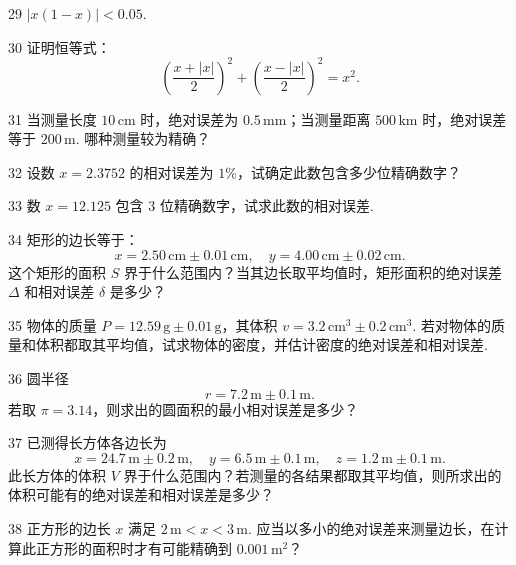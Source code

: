 \begin{prob}[S]{29}
$|x(1 - x)| < 0.05$.
\end{prob}

\begin{prob}[M]{30}
证明恒等式：
\[
\left(\frac{x + |x|}{2}\right)^2 + \left(\frac{x - |x|}{2}\right)^2 = x^2.
\]
\end{prob}

\begin{prob}[S]{31}
当测量长度 $10\,\mathrm{cm}$ 时，绝对误差为 $0.5\,\mathrm{mm}$；当测量距离 $500\,\mathrm{km}$ 时，绝对误差等于 $200\,\mathrm{m}$. 哪种测量较为精确？
\end{prob}

\begin{prob}[S]{32}
设数 $x = 2.3752$ 的相对误差为 $1\%$，试确定此数包含多少位精确数字？
\end{prob}

\begin{prob}[S]{33}
数 $x = 12.125$ 包含 $3$ 位精确数字，试求此数的相对误差.
\end{prob}

\begin{prob}[M]{34}
矩形的边长等于：
\[
x = 2.50\,\mathrm{cm} \pm 0.01\,\mathrm{cm}, \quad y = 4.00\,\mathrm{cm} \pm 0.02\,\mathrm{cm}.
\]
这个矩形的面积 $S$ 界于什么范围内？当其边长取平均值时，矩形面积的绝对误差 $\Delta$ 和相对误差 $\delta$ 是多少？
\end{prob}

\begin{prob}[M]{35}
物体的质量 $P = 12.59\,\mathrm{g} \pm 0.01\,\mathrm{g}$，其体积 $v = 3.2\,\mathrm{cm}^3 \pm 0.2\,\mathrm{cm}^3$. 若对物体的质量和体积都取其平均值，试求物体的密度，并估计密度的绝对误差和相对误差.
\end{prob}

\begin{prob}[M]{36}
圆半径
\[
r = 7.2\,\mathrm{m} \pm 0.1\,\mathrm{m}.
\]
若取 $\pi = 3.14$，则求出的圆面积的最小相对误差是多少？
\end{prob}

\begin{prob}[M]{37}
已测得长方体各边长为
\[
x = 24.7\,\mathrm{m} \pm 0.2\,\mathrm{m}, \quad y = 6.5\,\mathrm{m} \pm 0.1\,\mathrm{m}, \quad z = 1.2\,\mathrm{m} \pm 0.1\,\mathrm{m}.
\]
此长方体的体积 $V$ 界于什么范围内？若测量的各结果都取其平均值，则所求出的体积可能有的绝对误差和相对误差是多少？
\end{prob}

\begin{prob}[M]{38}
正方形的边长 $x$ 满足 $2\,\mathrm{m} < x < 3\,\mathrm{m}$. 应当以多小的绝对误差来测量边长，在计算此正方形的面积时才有可能精确到 $0.001\,\mathrm{m}^2$？
\end{prob}

